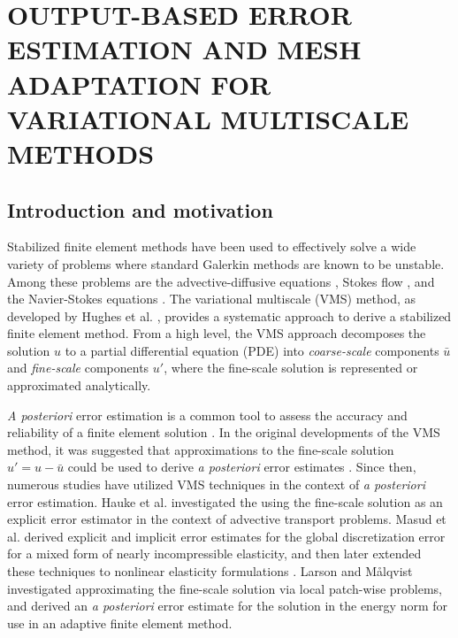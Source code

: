 \chapter{OUTPUT-BASED ERROR ESTIMATION AND MESH ADAPTATION
FOR VARIATIONAL MULTISCALE METHODS}
\label{chap:vms}

\section{Introduction and motivation}

Stabilized finite element methods have been used to
effectively solve a wide variety of problems where
standard Galerkin methods are known to be unstable.
Among these problems are the advective-diffusive
equations \cite{franca1992stabilized, hughes1989new},
Stokes flow \cite{hughes1986new, barth2004taxonomy},
and the Navier-Stokes equations \cite{brooks1982streamline,
franca1992stabilizedii, tezduyar1992incompressible}.
The variational multiscale (VMS) method, as developed
by Hughes et al. \cite{hughes1998variational,
hughes2007variational}, provides a systematic approach
to derive a stabilized finite element method. From
a high level, the VMS approach decomposes the solution
$u$ to a partial differential equation (PDE) into
\emph{coarse-scale} components $\bar{u}$ and
\emph{fine-scale} components $u'$,
where the fine-scale solution is represented or
approximated analytically.

\emph{A posteriori} error estimation is a common
tool to assess the accuracy and reliability of a
finite element solution \cite{ainsworth2011posteriori}.
In the original developments
of the VMS method, it was suggested that approximations
to the  fine-scale solution $u' = u - \bar{u}$
could be used to derive \emph{a posteriori} error
estimates \cite{hughes1998variational}. Since then,
numerous studies have utilized VMS techniques in
the context of \emph{a posteriori} error estimation.
Hauke et al. \cite{hauke2006multiscale, hauke2008variational}
investigated the using the fine-scale solution as
an explicit error estimator in the context
of advective transport problems. 
Masud et al. \cite{masud2011variational} derived explicit
and implicit error estimates for the global discretization
error for a mixed form of nearly incompressible elasticity,
and then later extended these techniques to nonlinear
elasticity formulations \cite{masud2013framework}.
Larson and M{\aa}lqvist
\cite{larson2007adaptive}
investigated approximating
the fine-scale solution via local patch-wise problems,
and derived an \emph{a posteriori} error estimate
for the solution in the energy norm for use in
an adaptive finite element method.

